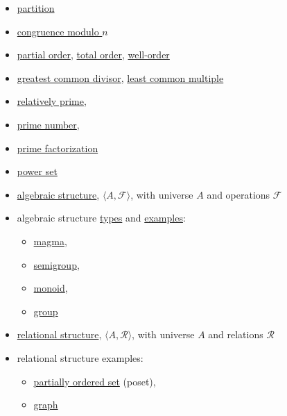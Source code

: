 \documentclass[12pt]{article}
\newcommand\<{\ensuremath{\langle}}
\renewcommand\>{\ensuremath{\rangle}}
\begin{document}
\begin{itemize}
\item \href{http://en.wikipedia.org/wiki/Partition_of_a_set}{partition}
\item \href{http://en.wikipedia.org/wiki/Congruence_relation}{congruence modulo $n$}
\item \href{http://en.wikipedia.org/wiki/Partially_ordered_set#Formal_definition}{partial order}, 
\href{http://en.wikipedia.org/wiki/Total_order}{total order},
\href{http://en.wikipedia.org/wiki/Well-order}{well-order}
\item \href{http://en.wikipedia.org/wiki/Greatest_common_divisor}{greatest common divisor}, 
\href{http://en.wikipedia.org/wiki/Least_common_multiple}{least common multiple}
\item \href{http://en.wikipedia.org/wiki/Coprime_integers}{relatively prime}, 
\item \href{http://en.wikipedia.org/wiki/Prime_number}{prime number},
\item \href{http://en.wikipedia.org/wiki/Fundamental_theorem_of_arithmetic}{prime factorization}
\item \href{http://en.wikipedia.org/wiki/Power_set}{power set}
\item \href{http://en.wikipedia.org/wiki/Algebraic_structure}{algebraic structure}, 
  $\<A, \mathcal{F}\>$, with universe $A$ and operations $\mathcal{F}$ 
\item algebraic structure \href{http://en.wikipedia.org/wiki/Outline_of_algebraic_structures#Types_of_algebraic_structures}{types} and 
\href{http://en.wikipedia.org/wiki/Outline_of_algebraic_structures}{examples}:
  \begin{itemize}
  \item \href{http://en.wikipedia.org/wiki/Magma_(algebra)}{magma}, 
  \item \href{http://en.wikipedia.org/wiki/Semigroup}{semigroup}, 
  \item \href{http://en.wikipedia.org/wiki/Monoid}{monoid}, 
  \item \href{http://en.wikipedia.org/wiki/Group_(mathematics)}{group} %
  \end{itemize}


\item \href{http://en.wikipedia.org/wiki/Structure_(mathematical_logic)}{relational structure}, 
  $\<A, \mathcal{R}\>$, with universe $A$ and relations $\mathcal{R}$ 
\item relational structure examples: 
  \begin{itemize}
  \item \href{http://en.wikipedia.org/wiki/Partially_ordered_set}{partially ordered set} (poset), 
    \item \href{http://en.wikipedia.org/wiki/Graph_(mathematics)}{graph}
  \end{itemize}


\end{itemize}
\end{document}
